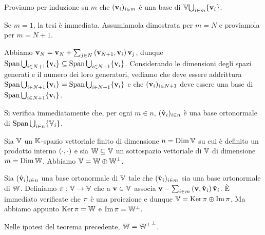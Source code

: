 \Proof Proviamo per induzione su $m$ che $(\mathbf{v}_i)_{i \in m}$ \`e una base di $\mathbb{V}{\bigcup_{i \in m} \lbrace \mathbf{v}_i \rbrace}$.
\par Se $m = 1$, la tesi \`e immediata. Assumiamola dimostrata per $m = N$ e proviamola per $m = N + 1$.
\par Abbiamo $\mathbf{v}_N = \mathbf{v}_N + \sum_{j \in N} \left ( \mathbf{v}_{N + 1} , \mathbf{v}_i \right )\mathbf{v}_j$, dunque $\operatorname{\operatorname{Span}}{\bigcup_{i \in N + 1} \lbrace \mathbf{v}_i \rbrace} \subseteq \operatorname{\operatorname{Span}}{\bigcup_{i \in N + 1} \lbrace \mathbf{v}_i \rbrace}$. Considerando le dimensioni degli spazi generati e il numero dei loro generatori, vediamo che deve essere addrittura $\operatorname{\operatorname{Span}}{\bigcup_{i \in N + 1} \lbrace \mathbf{v}_i \rbrace} = \operatorname{\operatorname{Span}}{\bigcup_{i \in N + 1} \lbrace \mathbf{v}_i \rbrace}$ e che $(\mathbf{v}_i)_{i \in N + 1}$ deve essere una base di $\operatorname{\operatorname{Span}}{\bigcup_{i \in N + 1} \lbrace \mathbf{v}_i \rbrace}$.
\par Si verifica immediatamente che, per ogni $m \in n$, $(\hat{\mathbf{v}}_i)_{i \in n}$ \`e una base ortonormale di $\operatorname{\operatorname{Span}}{\bigcup_{i \in n} \lbrace \mathbb{V}_i \rbrace}$. \EndProof
\begin{Theorem}
	Sia $\mathbb{V}$ un $\mathbb{K}$-spazio vettoriale finito di dimensione
  $n = \operatorname{\operatorname{Dim}}{\mathbb{V}}$ su cui \`e definito un prodotto interno
  $\left ( \cdot , \cdot \right )$ e sia $\mathbb{W} \subseteq \mathbb{V}$
  un sottospazio vettoriale di $\mathbb{V}$ di dimensione
  $m = \operatorname{\operatorname{Dim}}{\mathbb{W}}$. Abbiamo
  $\mathbb{V}
    = \mathbb{W} \oplus {\mathbb{W}}^\perp$.
\end{Theorem}
\Proof Sia $(\hat{\mathbf{v}}_i)_{i \in n}$ una base ortonormale di $\mathbb{V}$ tale che $(\hat{\mathbf{v}}_i)_{i \in m}$ sia una base ortonormale di $\mathbb{W}$. Definiamo $\Projection: \LinearSpace \rightarrow \LinearSpace$ che a $\mathbf{v} \in \mathbb{V}$ associa $\mathbf{v} - \sum_{i \in m} \left ( \mathbf{v} , \hat{\mathbf{v}}_i \right )\hat{\mathbf{v}}_i$. \`E immediato verificate che $\Projection$ \`e una proiezione e dunque $\LinearSpace = \Kernel{\Projection} \oplus \Image{\Projection}$. Ma abbiamo appunto $\Kernel{\Projection} = \VarLinearSpace$ e $\Image{\Projection} = \OrthogonalComplement{\VarLinearSpace}$. \EndProof
\begin{Corollary}
	Nelle ipotesi del teorema precedente, $\mathbb{W} = {{\mathbb{W}}^\perp}^\perp$.
\end{Corollary}
